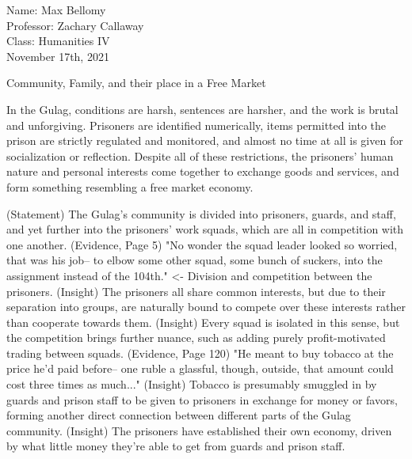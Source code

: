 \documentclass[12pt]{article}
\begin{document}
\begin{flushleft}

Name: Max Bellomy\\
Professor: Zachary Callaway\\
Class: Humanities IV\\
November 17th, 2021\\

\begin{center}
Community, Family, and their place in a Free Market
\end{center}


\setlength{\parindent}{0.5in}


In the Gulag, conditions are harsh, sentences are harsher, and the work is brutal and unforgiving.
Prisoners are identified numerically, items permitted into the prison are strictly regulated and monitored, and almost no time at all is given for socialization or reflection.
Despite all of these restrictions, the prisoners' human nature and personal interests come together to exchange goods and services, and form something resembling a free market economy.

(Statement) The Gulag's community is divided into prisoners, guards, and staff, and yet further into the prisoners' work squads, which are all in competition with one another.
(Evidence, Page 5) "No wonder the squad leader looked so worried, that was his job-- to elbow some other squad, some bunch of suckers, into the assignment instead of the 104th." <- Division and competition between the prisoners.
(Insight) The prisoners all share common interests, but due to their separation into groups, are naturally bound to compete over these interests rather than cooperate towards them.
(Insight) Every squad is isolated in this sense, but the competition brings further nuance, such as adding purely profit-motivated trading between squads.
(Evidence, Page 120) "He meant to buy tobacco at the price he'd paid before-- one ruble a glassful, though, outside, that amount could cost three times as much..."  
(Insight) Tobacco is presumably smuggled in by guards and prison staff to be given to prisoners in exchange for money or favors, forming another direct connection between different parts of the Gulag community.
(Insight) The prisoners have established their own economy, driven by what little money they're able to get from guards and prison staff.



\end{flushleft}
\end{document}

